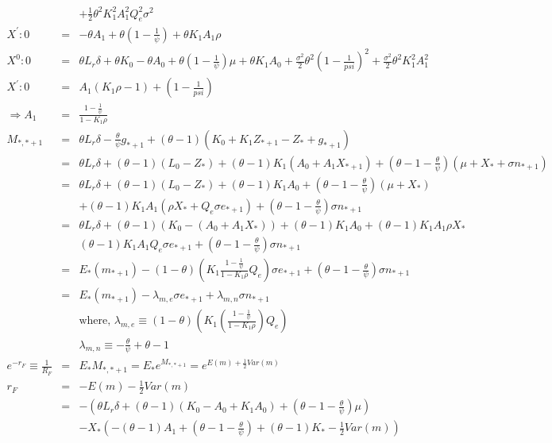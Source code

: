 \documentclass[]{article}
\begin{document}
\begin{eqnarray*}
&&+ \frac{1}{2} \theta ^2 K_1^2 A_1^2 Q_e^2 \sigma ^2\\
X ^ \prime : 0 &=& -\theta A_1 + \theta \left( 1 - \frac{1}{\psi}\right) + \theta K_1 A_1 \rho \\
X ^ 0 : 0 &=& \theta L_r \delta + \theta K_0 - \theta A_0 + \theta \left(1-\frac{1}{\psi}\right) \mu + \theta K_1 A_0 + \frac{\sigma ^2}{2} \theta ^2 \left( 1-\frac{1}{psi} \right) ^2 + \frac{\sigma ^2}{2} \theta ^2 K_1^2 A_1^2\\
X^\prime : 0 &=& A_1\left(K_1 \rho -1 \right) + \left(1-\frac{1}{psi}\right)\\
\Rightarrow A_1 &=& \frac{1-\frac{1}{\psi}}{1-K_1 \rho}\\
M_{*,*+1} &=& \theta L_r \delta - \frac{\theta}{\psi} g_{*+1} + \left(\theta -1\right) \left( K_0 + K_1 Z_{*+1} - Z_* + g_{*+1}\right)\\
&=& \theta L_r \delta + \left(\theta -1 \right) \left(L_0 - Z_*\right) + \left(\theta -1\right) K_1 \left(A_0 + A_1 X_{*+1}\right) + \left(\theta -1 - \frac{\theta}{\psi}\right)\left(\mu + X_* +\sigma n_{*+1}\right)\\
&=& \theta L_r \delta + \left(\theta -1 \right) \left(L_0 - Z_*\right) + \left(\theta -1\right) K_1 A_0 + \left(\theta -1 - \frac{\theta}{\psi}\right) \left(\mu + X_*\right) \\
&& + \left(\theta -1\right)K_1 A_1 \left(\rho X_* + Q_e \sigma e_{*+1}\right) + \left(\theta - 1- \frac{\theta}{\psi}\right) \sigma n_{*+1}\\
&=& \theta L_r \delta + \left(\theta -1\right) \left(K_0-\left(A_0 + A_1 X_*\right)\right) + \left(\theta -1\right) K_1 A_0 + \left(\theta -1\right)K_1 A_1 \rho X_*\\
&& \left(\theta -1\right) K_1 A_1 Q_e \sigma e_{*+1} + \left(\theta -1 - \frac{\theta}{\psi}\right)\sigma n_{*+1}\\
&=& E_* \left(m_{*+1}\right) - \left(1-\theta \right) \left(K_1 \frac{1-\frac{1}{\psi}}{1-K_1\rho} Q_e\right) \sigma e_{*+1}+\left(\theta -1 - \frac{\theta}{\psi}\right) \sigma n_{*+1}\\
&=& E_* \left(m_{*+1}\right) - \lambda _{m,e} \sigma e_{*+1} + \lambda _{m,n} \sigma n_{*+1}\\
&& \mbox{where, } \lambda _{m,e} \equiv \left(1-\theta \right)\left(K_1 \left(\frac{1-\frac{1}{\psi}}{1-K_1\rho}\right)Q_e\right)\\
&& \lambda _{m,n} \equiv -\frac{\theta}{\psi} + \theta -1\\
e^{-r_F} \equiv \frac{1}{R_F} &=& E_* M_{*,*+1} = E_* e^{M_{*,*+1}}= e^{E\left(m\right)+\frac{1}{2} Var \left(m\right)}\\
r_F &=& -E\left(m\right) - \frac{1}{2}Var\left(m\right)\\
&=& -\left(\theta L_r \delta + \left(\theta -1\right)\left(K_0 - A_0 + K_1 A_0\right)+\left(\theta-1- \frac{\theta}{\psi}\right)\mu\right) \\
&& - X_* \left(-\left(\theta -1\right)A_1 + \left(\theta -1 -\frac{\theta}{\psi}\right)+ \left(\theta -1\right)K_* - \frac{1}{2}Var\left(m\right) \right)
\end{eqnarray*}
\end{document}
